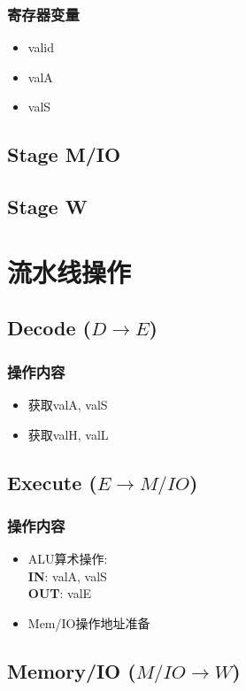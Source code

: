 \documentclass[10pt]{book}
\begin{document}
\subsubsection{寄存器变量}
\begin{itemize}
  \item valid
  \item valA
  \item valS
\end{itemize}

\subsection{Stage M/IO}

\subsection{Stage W}

\section{流水线操作}
\subsection{Decode ($D\rightarrow E$)}
\subsubsection{操作内容}
\begin{itemize}
  \item 获取valA, valS
  \item 获取valH, valL
\end{itemize}

\subsection{Execute ($E\rightarrow M/IO$)}
\subsubsection{操作内容}
\begin{itemize}
  \item ALU算术操作:\\
  \textbf{IN}: valA, valS\\
  \textbf{OUT}: valE
  \item Mem/IO操作地址准备
\end{itemize}

\subsection{Memory/IO ($M/IO\rightarrow W$)}
\end{document}
